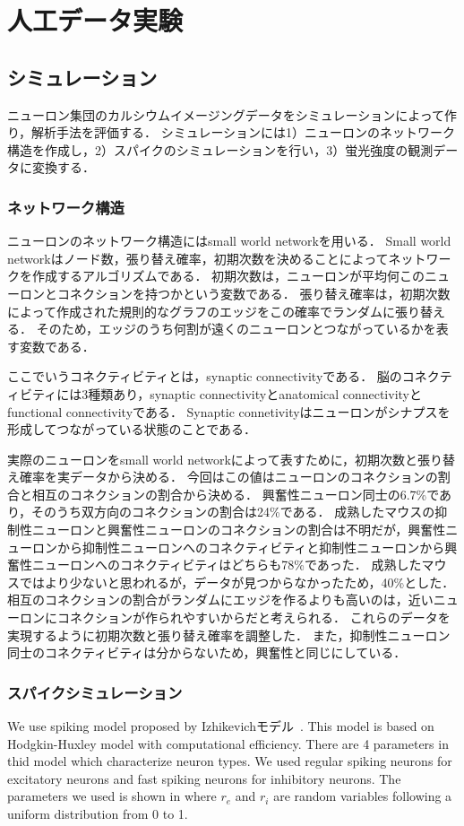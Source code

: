 \chapter{人工データ実験}
\section{シミュレーション}
ニューロン集団のカルシウムイメージングデータをシミュレーションによって作り，解析手法を評価する．
シミュレーションには1）ニューロンのネットワーク構造を作成し，2）スパイクのシミュレーションを行い，3）蛍光強度の観測データに変換する．
\subsection{ネットワーク構造}
ニューロンのネットワーク構造にはsmall world network\cite{}を用いる．
Small world networkはノード数，張り替え確率，初期次数を決めることによってネットワークを作成するアルゴリズムである．
初期次数は，ニューロンが平均何このニューロンとコネクションを持つかという変数である．
張り替え確率は，初期次数によって作成された規則的なグラフのエッジをこの確率でランダムに張り替える．
そのため，エッジのうち何割が遠くのニューロンとつながっているかを表す変数である．

ここでいうコネクティビティとは，synaptic connectivityである．
脳のコネクティビティには3種類あり，synaptic connectivityとanatomical connectivityとfunctional connectivityである．
Synaptic connetivityはニューロンがシナプスを形成してつながっている状態のことである．

実際のニューロンをsmall world networkによって表すために，初期次数と張り替え確率を実データから決める．
今回はこの値はニューロンのコネクションの割合と相互のコネクションの割合から決める．
興奮性ニューロン同士の6.7\%であり，そのうち双方向のコネクションの割合は24\%である\cite{}．
成熟したマウスの抑制性ニューロンと興奮性ニューロンのコネクションの割合は不明だが，興奮性ニューロンから抑制性ニューロンへのコネクティビティと抑制性ニューロンから興奮性ニューロンへのコネクティビティはどちらも78\%であった\cite{Holmgren2003}．
成熟したマウスではより少ないと思われるが，データが見つからなかったため，40\%とした．
相互のコネクションの割合がランダムにエッジを作るよりも高いのは，近いニューロンにコネクションが作られやすいからだと考えられる．
これらのデータを実現するように初期次数と張り替え確率を調整した．
また，抑制性ニューロン同士のコネクティビティは分からないため，興奮性と同じにしている．
\subsection{スパイクシミュレーション}
We use spiking model proposed by Izhikevichモデル~\cite{Izhikevich2003}.
This model is based on Hodgkin-Huxley model with computational efficiency.
There are 4 parameters in thid model which characterize neuron types.
We used regular spiking neurons for excitatory neurons and fast spiking neurons for inhibitory neurons.
The parameters we used is shown in  where $r_e$ and $r_i$ are random variables following a uniform distribution from 0 to 1.

